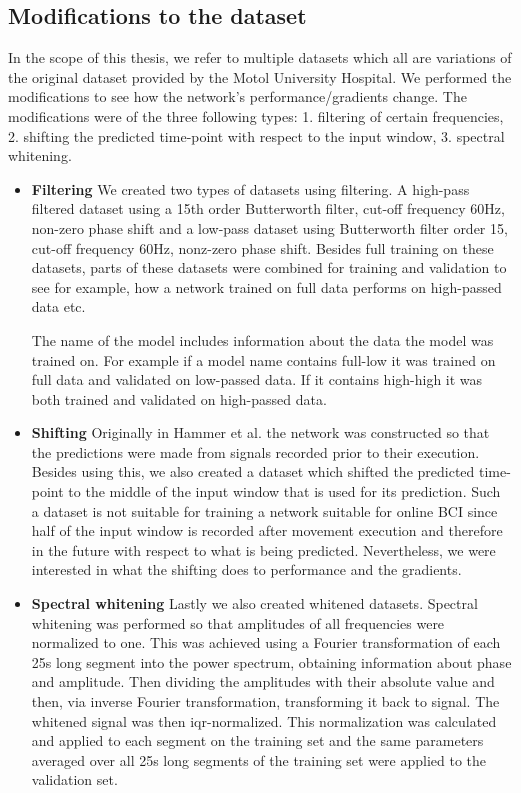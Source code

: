\subsection{Modifications to the dataset}
In the scope of this thesis, we refer to multiple datasets which all are variations of the original dataset provided by the Motol University Hospital.
We performed the modifications to see how the network’s performance/gradients change.
The modifications were of the three following types: 1. filtering of certain frequencies, 2. shifting the predicted time-point with respect to the input window, 3. spectral whitening.
\begin{itemize}
\item \textbf{Filtering} We created two types of datasets using filtering.
A high-pass filtered dataset using a 15th order Butterworth filter, cut-off frequency 60Hz, non-zero phase shift and a low-pass dataset using Butterworth filter order 15, cut-off frequency 60Hz, nonz-zero phase shift.
Besides full training on these datasets, parts of these datasets were combined for training and validation to see for example, how a network trained on full data performs on high-passed data etc.

The name of the model includes information about the data the model was trained on.
For example if a model name contains full-low it was trained on full data and validated on low-passed data.
If it contains high-high it was both trained and validated on high-passed data.

\item \textbf{Shifting} Originally in Hammer et al. the network was constructed so that the predictions were made from signals recorded prior to their execution.
Besides using this, we also created a dataset which shifted the predicted time-point to the middle of the input window that is used for its prediction.
Such a dataset is not suitable for training a network suitable for online BCI since half of the input window is recorded after movement execution and therefore in the future with respect to what is being predicted.
Nevertheless, we were interested in what the shifting does to performance and the gradients.


\item \textbf{Spectral whitening} Lastly we also created whitened datasets. Spectral whitening was performed so that amplitudes of all frequencies were normalized to one.
This was achieved using a Fourier transformation of each 25s long segment into the power spectrum, obtaining information about phase and amplitude.
Then dividing the amplitudes with their absolute value and then, via inverse Fourier transformation, transforming it back to signal.
The whitened signal was then iqr-normalized. This normalization was calculated and applied to each segment on the training set and the same parameters averaged over all 25s long segments of the training set were applied to the validation set.

\end{itemize}

